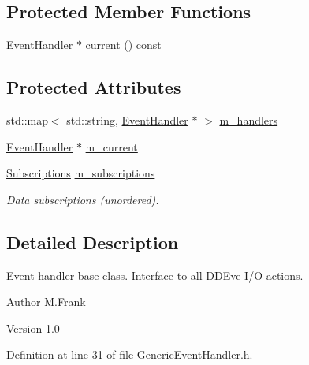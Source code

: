 \subsection*{Protected Member Functions}
\begin{DoxyCompactItemize}
\item 
\hyperlink{class_d_d4hep_1_1_event_handler}{EventHandler} $\ast$ \hyperlink{class_d_d4hep_1_1_generic_event_handler_a2d8d22b68acdb36e966f20bb5cb4b825}{current} () const 
\end{DoxyCompactItemize}
\subsection*{Protected Attributes}
\begin{DoxyCompactItemize}
\item 
std::map$<$ std::string, \hyperlink{class_d_d4hep_1_1_event_handler}{EventHandler} $\ast$ $>$ \hyperlink{class_d_d4hep_1_1_generic_event_handler_ac699842a86c41b3b4e3424571d83790c}{m\_\-handlers}
\item 
\hyperlink{class_d_d4hep_1_1_event_handler}{EventHandler} $\ast$ \hyperlink{class_d_d4hep_1_1_generic_event_handler_a63ec98dd603fe8124e8afde68f36e37a}{m\_\-current}
\item 
\hyperlink{class_d_d4hep_1_1_generic_event_handler_a4b7fd1ba9fc0adab2fa1885162e69076}{Subscriptions} \hyperlink{class_d_d4hep_1_1_generic_event_handler_a3401232a3e8f43d779111f456176a3ba}{m\_\-subscriptions}
\begin{DoxyCompactList}\small\item\em Data subscriptions (unordered). \item\end{DoxyCompactList}\end{DoxyCompactItemize}


\subsection{Detailed Description}
Event handler base class. Interface to all \hyperlink{struct_d_d4hep_1_1_d_d_eve}{DDEve} I/O actions. \begin{DoxyAuthor}{Author}
M.Frank 
\end{DoxyAuthor}
\begin{DoxyVersion}{Version}
1.0 
\end{DoxyVersion}


Definition at line 31 of file GenericEventHandler.h.

